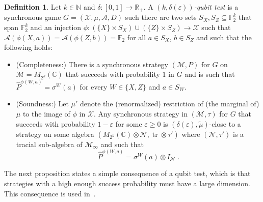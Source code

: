 \documentclass[11pt]{article}
\newtheorem{remark}[theorem]{Remark}
\theoremstyle{definition}
\newtheorem{definition}[theorem]{Definition}
\newcommand{\Id}{\ensuremath{I}}
\newcommand{\field}{\mathbb{F}_2}
\newcommand{\C}{\ensuremath{\mathbb{C}}}
\newcommand{\N}{\ensuremath{\mathbb{N}}}
\newcommand{\R}{\ensuremath{\mathbb{R}}}
\newcommand{\mA}{\ensuremath{\mathcal{A}}}
\newcommand{\mM}{\ensuremath{\mathcal{M}}}
\newcommand{\mX}{\ensuremath{\mathcal{X}}}
\newcommand{\eps}{\varepsilon}
\newcommand{\mN}{\mathcal{N}}
\DeclareMathOperator{\tr}{tr}
\begin{document}
\begin{definition}
Let $k\in \N$ and $\delta:[0,1]\to\R_+$. 
A \emph{$(k,\delta(\eps))$-qubit test} is a synchronous game $G=(\mX,\mu,\mA,D)$ such there are two sets $S_X,S_Z\subseteq \field^k$ that span $\field^k$ and an injection $\phi:(\{X\}\times S_X) \cup (\{Z\}\times S_Z) \to \mX$ such that $\mA(\phi({X},a))=\mA(\phi({Z},b))=\field$ for all $a\in S_X$, $b\in S_Z$ and such that the following holds:
\begin{itemize}
\item (Completeness:) There is a synchronous strategy $(\mM,P)$ for $G$ on $\mM=M_{2^{k}}(\C)$ that succeeds with probability $1$ in $G$ and is such that $\widehat{P}^{\phi({W},a)} = \sigma^W(a)$ for every $W\in\{X,Z\}$ and $a\in S_W$. 
\item (Soundness:) Let $\mu'$ denote the (renormalized) restriction of (the marginal of) $\mu$ to the image of $\phi$ in $\mX$.
Any synchronous strategy in $(\mM,\tau)$ for $G$ that succeeds with probability $1-\eps$ for some $\eps\geq 0$ is $(\delta(\eps),\tilde{\mu})$-close to a strategy on some algebra $(M_{2^{k}}(\C)\otimes \mN,\tr\otimes \tau')$ where $(\mN,\tau')$ is a tracial sub-algebra of $\mM_\infty$ and such that
\[\widehat{P}^{\phi({W},a)} = \sigma^W(a)\otimes \Id_\mN\;.\]
\end{itemize}
\end{definition}


The next proposition states a simple consequence of a qubit test, which is that strategies with a high enough success probability must have a large dimension. This consequence is used in~\cite{ji2020mip}. 
\end{document}
